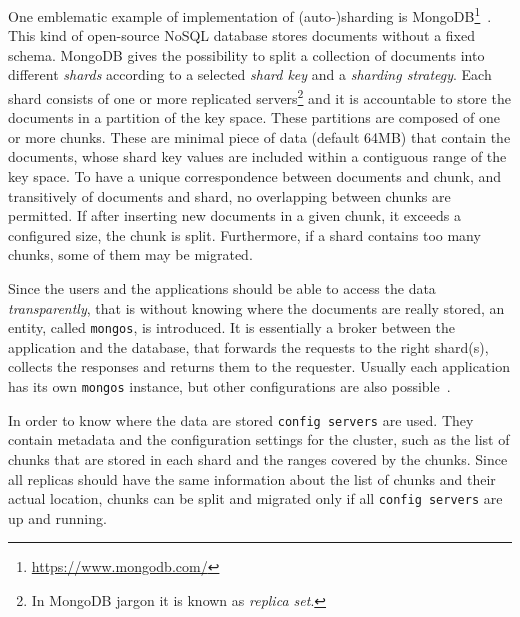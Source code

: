 One emblematic example of implementation of (auto-)sharding is
MongoDB\footnote{\url{https://www.mongodb.com/}}~\cite{bib:mongodb}. This kind
of open-source NoSQL database stores documents without a fixed schema.
MongoDB gives the possibility to split a collection of documents into 
different \emph{shards} according to a selected \emph{shard key} and a 
\emph{sharding strategy}. Each shard consists of one or more replicated 
servers\footnote{In MongoDB jargon it is known as \emph{replica set}.} and
it is accountable to store the documents in a partition of the key space.
These partitions are composed of one or more chunks. These are minimal piece of
data (default 64MB) that contain the documents, whose shard key values are
included within a contiguous range of the key space. To have a unique 
correspondence between documents and chunk, and transitively of documents
and shard, no overlapping between chunks are permitted.
If after inserting new documents in a given chunk, it exceeds a configured
size, the chunk is split. Furthermore, if a shard contains too many chunks,
some of them may be migrated.


Since the users and the applications should be able to access the data 
\emph{transparently}, that is without knowing where the documents are really 
stored, an entity, called \texttt{mongos}, is introduced. It is essentially a 
broker between the application and the database, that forwards the requests to 
the right shard(s), collects the responses and returns them to the requester. 
Usually each application has its own \texttt{mongos} instance, but other 
configurations are also possible~\cite{bib:mongodb}.

In order to know where the data are stored \texttt{config servers} are
used. They contain metadata and the configuration settings for the 
cluster, such as the list of chunks that are stored in each shard and the ranges
covered by the chunks. Since all replicas should have the same information
about the list of chunks and their actual location, chunks can be split and
migrated only if all \texttt{config servers} are up and running.

